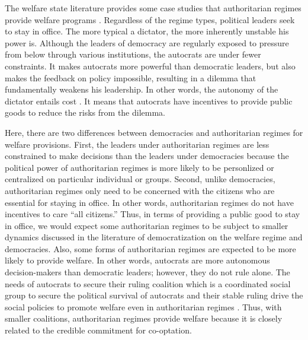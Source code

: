 \documentclass[12pt, letterpage, notitlepage]{article}
\begin{document}
The welfare state literature provides some case studies that authoritarian regimes provide welfare programs \citep{Tang2000, Kwon2005a, Orenstein2008, Bader2015, Ong2015, Morgenbesser2017}. Regardless of the regime types, political leaders seek to stay in office. The more typical a dictator, the more inherently unstable his power is. Although the leaders of democracy are regularly exposed to pressure from below through various institutions, the autocrats are under fewer constraints. It makes autocrats more powerful than democratic leaders, but also makes the feedback on policy impossible, resulting in a dilemma that fundamentally weakens his leadership. In other words, the autonomy of the dictator entails cost \citep[335]{Wintrobe1998}. It means that autocrats have incentives to provide public goods to reduce the risks from the dilemma. 

Here, there are two differences between democracies and authoritarian regimes for welfare provisions. First, the leaders under authoritarian regimes are less constrained to make decisions than the leaders under democracies because the political power of authoritarian regimes is more likely to be personlized or centralized on particular individual or groups. Second, unlike democracies, authoritarian regimes only need to be concerned with the citizens who are essential for staying in office. In other words, authoritarian regimes do not have incentives to care ``all citizens.'' Thus, in terms of providing a public good to stay in office, we would expect some authoritarian regimes to be subject to smaller dynamics discussed in the literature of democratization on the welfare regime and democracies. Also, some forms of authoritarian regimes are expected to be more likely to provide welfare. In other words, autocrats are more autonomous decision-makers than democratic leaders; however, they do not rule alone. The needs of autocrats to secure their ruling coalition which is a coordinated social group to secure the political survival of autocrats and their stable ruling drive the social policies to promote welfare even in authoritarian regimes \citep{Svolik2012}. Thus, with smaller coalitions, authoritarian regimes provide welfare because it is closely related to the credible commitment for co-optation.
\end{document}
